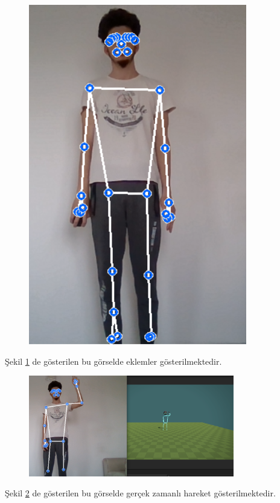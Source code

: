 \documentclass[12pt, a4paper]{article}
\begin{document}
	\begin{figure}[!ht]
		\caption{}
		\centering
		\includegraphics[height=0.8\textheight]{Ben2.png}
		
		\label{Ben}
	\end{figure}
	\newpage
	Şekil \ref{Ben} de gösterilen bu görselde eklemler gösterilmektedir.
	\begin{figure}[!ht]
		\caption{}
		\centering
		\includegraphics[width=0.8\textwidth]{Klon.PNG}
		
		\label{Klon}
	\end{figure}
	\newpage
	Şekil \ref{Klon} de gösterilen bu görselde gerçek zamanlı hareket gösterilmektedir.
	\newpage
	
	
	
	 
	
	
\end{document}
